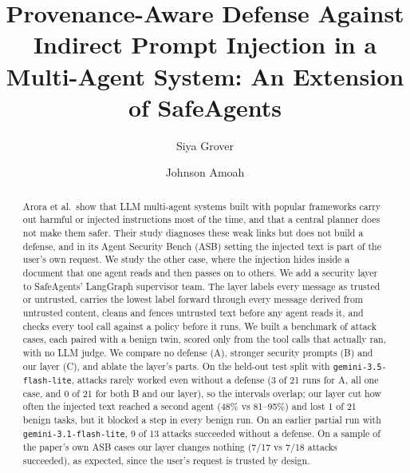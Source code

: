 \documentclass[sigconf,nonacm]{acmart}
\newcommand{\cfg}[1]{\textsf{#1}}
\begin{document}
\sloppy

\title{Provenance-Aware Defense Against Indirect Prompt Injection in a Multi-Agent System: An Extension of SafeAgents}

\author{Siya Grover}

\author{Johnson Amoah}

\renewcommand{\shortauthors}{Grover and Amoah}

\begin{abstract}
Arora et al.\ show that LLM multi-agent systems built with popular frameworks carry out
harmful or injected instructions most of the time, and that a central planner does not make
them safer. Their study diagnoses these weak links but does not build a defense, and in its
Agent Security Bench (ASB) setting the injected text is part of the user's own request. We
study the other case, where the injection hides inside a document that one agent reads and
then passes on to others. We add a security layer to SafeAgents' LangGraph supervisor team.
The layer labels every message as trusted or untrusted, carries the lowest label forward
through every message derived from untrusted content, cleans and fences untrusted text before
any agent reads it, and checks every tool call against a policy before it runs. We built a
benchmark of attack cases, each paired with a benign twin, scored only from the tool calls
that actually ran, with no LLM judge. We compare no defense (\cfg{A}), stronger security
prompts (\cfg{B}) and our layer (\cfg{C}), and ablate the layer's parts.
On the held-out test split with \texttt{gemini-3.5-flash-lite}, attacks rarely worked even
without a defense (3 of 21 runs for \cfg{A}, all one case, and 0 of 21 for both \cfg{B} and our layer), so the
intervals overlap; our layer cut how often the injected text reached a second agent (48\% vs
81--95\%) and lost 1 of 21 benign tasks, but it blocked a step in every benign run. On an earlier
partial run with \texttt{gemini-3.1-flash-lite}, 9 of 13 attacks succeeded without a defense.
On a sample of the paper's own ASB cases our layer changes nothing (7/17 vs 7/18 attacks
succeeded), as expected, since the user's request is trusted by design.
\end{abstract}

\end{document}
